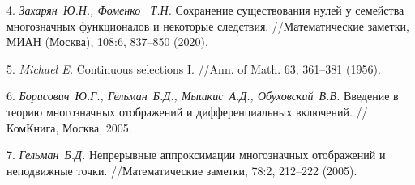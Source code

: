 4.
{\it Захарян~Ю.Н., Фоменко ~Т.Н.}  Сохранение существования нулей у семейства многозначных функционалов и некоторые следствия. //Математические заметки, МИАН (Мос\-ква), 108:6, 837--850 (2020).

5.
{\it Michael E. } Continuous selections I. //Ann. of Math. 63, 361--381 (1956).

6.
{\it Борисович~Ю.Г., Гельман~Б.Д., Мышкис~А.Д., Обухов\-ский~В.В.}
Введение в теорию многозначных отображений и дифференциальных включений. //КомКнига, Москва, 2005.

7.
{\it Гельман~Б.Д.} Непрерывные аппроксимации многозначных отображений и неподвижные точки. //Математические заметки,  78:2, 212--222 (2005).
